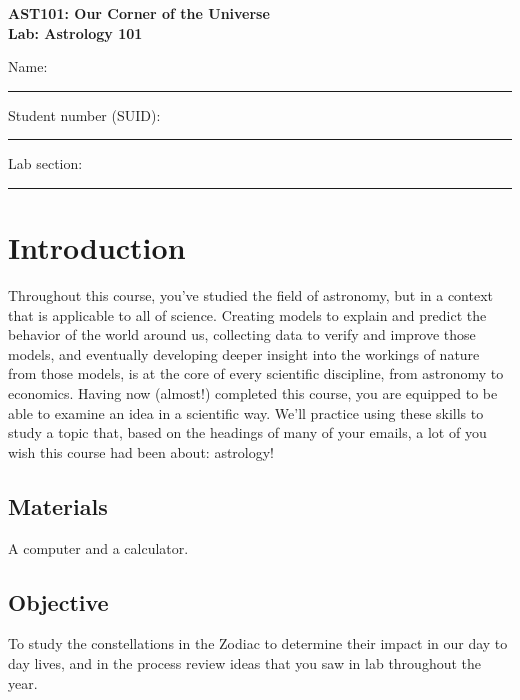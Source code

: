 \documentclass[11pt]{article}
\begin{document}
\begin{center}
\textbf{\Large
AST101: Our Corner of the Universe \\
\vspace*{0.1cm}
Lab: Astrology 101
}
\end{center}

\vspace*{0.5cm}

{\Large Name:}\vspace*{0.5cm}\\\hrule
{\Large Student number (SUID):}\vspace*{0.5cm}\\\hrule
{\Large Lab section:}\vspace*{0.5cm}\\\hrule
\vspace*{0.5cm}

\section{Introduction}

Throughout this course, you've studied the field of astronomy, but in a context that is applicable to all of science. Creating models to explain and predict the behavior of the world around us, collecting data to verify and improve those models, and eventually developing deeper insight into the workings of nature from those models, is at the core of every scientific discipline, from astronomy to economics. Having now (almost!) completed this course, you are equipped to be able to examine an idea in a scientific way. We'll practice using these skills to study a topic that, based on the headings of many of your emails, a lot of you wish this course had been about: astrology!

\subsection*{Materials}

A computer and a calculator.

\subsection*{Objective}

To study the constellations in the Zodiac to determine their impact in our day to day lives, and in the process review ideas that you saw in lab throughout the year. \\ \\ \\
\end{document}
